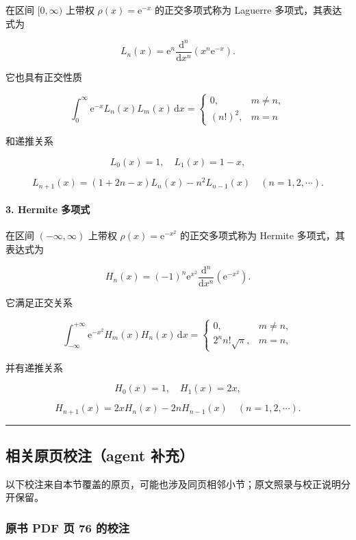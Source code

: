 \documentclass[
  10pt,
  fontset=fandol]{ctexart}
\begin{document}
在区间 \([0,\infty)\) 上带权 \(\rho(x)=\mathrm e^{-x}\) 的正交多项式称为 Laguerre 多项式，其表达式为

\[
L_n(x)=\mathrm e^n\frac{\mathrm d^n}{\mathrm dx^n}(x^n\mathrm e^{-x}).\tag{3.4.11}
\]

它也具有正交性质

\[
\int_0^\infty \mathrm e^{-x}L_n(x)L_m(x)\,\mathrm dx=
\begin{cases}
0,&m\ne n,\\
(n!)^2,&m=n
\end{cases}
\]

和递推关系

\[
L_0(x)=1,\quad L_1(x)=1-x,
\]

\[
L_{n+1}(x)=(1+2n-x)L_n(x)-n^2L_{n-1}(x)\quad(n=1,2,\cdots).
\]

\paragraph{3. Hermite 多项式}\label{hermite-ux591aux9879ux5f0f}

在区间 \((-\infty,\infty)\) 上带权 \(\rho(x)=\mathrm e^{-x^2}\) 的正交多项式称为 Hermite 多项式，其表达式为

\[
H_n(x)=(-1)^n\mathrm e^{x^2}\frac{\mathrm d^n}{\mathrm dx^n}(\mathrm e^{-x^2}).\tag{3.4.12}
\]

它满足正交关系

\[
\int_{-\infty}^{+\infty}\mathrm e^{-x^2}H_m(x)H_n(x)\,\mathrm dx=
\begin{cases}
0,&m\ne n,\\
2^nn!\sqrt\pi,&m=n,
\end{cases}
\]

并有递推关系

\[
H_0(x)=1,\quad H_1(x)=2x,
\]

\[
H_{n+1}(x)=2xH_n(x)-2nH_{n-1}(x)\quad(n=1,2,\cdots).
\]

\begin{center}\rule{0.5\linewidth}{0.5pt}\end{center}

\subsection{相关原页校注（agent 补充）}\label{ux76f8ux5173ux539fux9875ux6821ux6ce8agent-ux8865ux5145}

以下校注来自本节覆盖的原页，可能也涉及同页相邻小节；原文照录与校正说明分开保留。

\subsubsection{原书 PDF 页 76 的校注}\label{ux539fux4e66-pdf-ux9875-76-ux7684ux6821ux6ce8}
\end{document}
